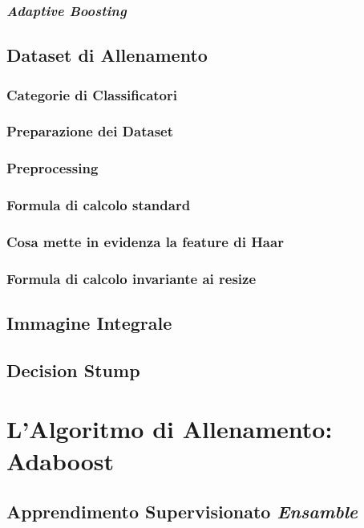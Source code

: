         \subsection{\emph{Adaptive Boosting}}
        \label{sub:adaptive_boosting}
    \section{Dataset di Allenamento}
    \label{sec:training_dataset}
        \subsection{Categorie di Classificatori}
        \label{sub:classifiers_categories}
        \subsection{Preparazione dei Dataset}
        \label{sub:datasets_setup}
        \subsection{Preprocessing}
        \subsection{Formula di calcolo standard}
        \subsection{Cosa mette in evidenza la feature di Haar}
        \subsection{Formula di calcolo invariante ai resize}
    \section{Immagine Integrale}
    \label{sec:integral_image}
    \section{Decision Stump}
    \label{sec:decision_stump}

\chapter{L'Algoritmo di Allenamento: Adaboost}
\label{chap:adaboost}
    \section{Apprendimento Supervisionato \emph{Ensamble}}
    \label{sec:supervised_ensamble_learning}
